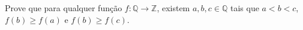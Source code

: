 Prove que para qualquer função \(f \colon \mathbb{Q} \to \mathbb{Z}\), existem \(a, b, c \in \mathbb{Q}\) tais que \(a < b < c\), \(f(b) \ge f(a)\) e \(f(b) \ge f(c)\).
